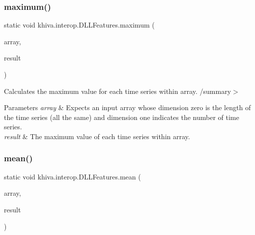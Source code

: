 \mbox{\label{classkhiva_1_1interop_1_1_d_l_l_features_aac41033b24b4c8001cefc20d365a9cc4}} 
\subsubsection{\texorpdfstring{maximum()}{maximum()}}
{\footnotesize\ttfamily static void khiva.\+interop.\+D\+L\+L\+Features.\+maximum (\begin{DoxyParamCaption}\item[{\mbox{[}\+In\mbox{]} ref Int\+Ptr}]{array,  }\item[{\mbox{[}\+Out\mbox{]} out Int\+Ptr}]{result }\end{DoxyParamCaption})\hspace{0.3cm}{\ttfamily [static]}}



Calculates the maximum value for each time series within array. /summary$>$ 
\begin{DoxyParams}{Parameters}
{\em array} & Expects an input array whose dimension zero is the length of the time series (all the same) and dimension one indicates the number of time series.\\
\hline
{\em result} & The maximum value of each time series within array.\\
\hline
\end{DoxyParams}


\mbox{\label{classkhiva_1_1interop_1_1_d_l_l_features_a79cdfdec4a4a04bb765842747d6fb955}} 
\subsubsection{\texorpdfstring{mean()}{mean()}}
{\footnotesize\ttfamily static void khiva.\+interop.\+D\+L\+L\+Features.\+mean (\begin{DoxyParamCaption}\item[{\mbox{[}\+In\mbox{]} ref Int\+Ptr}]{array,  }\item[{\mbox{[}\+Out\mbox{]} out Int\+Ptr}]{result }\end{DoxyParamCaption})\hspace{0.3cm}{\ttfamily [static]}}



